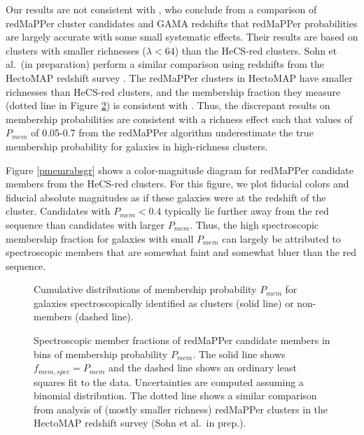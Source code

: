 Our results are not consistent with \citet{rozo15b}, who conclude from a comparison of 
redMaPPer cluster candidates and GAMA redshifts that redMaPPer probabilities are largely
accurate with some small systematic effects. Their results are based on clusters with 
smaller richnesses ($\lambda <64$) than the HeCS-red clusters.  Sohn et al.~(in preparation)
perform a similar comparison using redshifts from the HectoMAP redshift survey
\citep{geller14,hwang16}.  The redMaPPer clusters in HectoMAP have smaller 
richnesses than HeCS-red clusters, and the membership fraction they measure 
(dotted line in Figure \ref{memprobspec}) is consistent with \citet{rozo15b}. 
Thus, the discrepant results on membership probabilities are consistent with 
a richness effect such that values of $P_{mem}$ of 0.05-0.7 from the redMaPPer algorithm 
underestimate the true membership probability for galaxies in high-richness clusters.

Figure \ref{pmemrabsgr} shows a color-magnitude diagram for redMaPPer candidate members from 
the HeCS-red clusters.  For this figure, we plot fiducial colors and fiducial 
absolute magnitudes as if these galaxies were at the redshift of the cluster.   Candidates 
with $P_{mem}<0.4$ typically lie further away from the red sequence than 
candidates with larger $P_{mem}$.  Thus, the high spectroscopic membership fraction 
for galaxies with small $P_{mem}$ can largely be attributed to spectroscopic members that are 
somewhat faint and somewhat bluer than the red sequence.

\begin{figure} 
\caption{\label{memprobks} Cumulative distributions of membership probability $P_{mem}$ 
for galaxies spectroscopically identified as clusters (solid line) or non-members (dashed line). 
  }
\end{figure}

\begin{figure} 
\caption{\label{memprobspec} Spectroscopic member fractions of redMaPPer candidate members 
in bins of membership probability $P_{mem}$.  The solid line shows $f_{mem,spec}=P_{mem}$ 
and the dashed line shows an ordinary least squares fit to the data.  Uncertainties are 
computed assuming a binomial distribution.  The dotted line shows a similar comparison 
from analysis of (mostly smaller richness) redMaPPer clusters in the HectoMAP redshift survey (Sohn et al.~in prep.).
  }
\end{figure}

